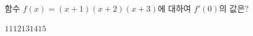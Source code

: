 함수 $f(x)=(x+1)(x+2)(x+3)$에 대하여 $f'(0)$의 값은?
\begin{choices32}{$11$}{$12$}{$13$}{$14$}{$15$}\end{choices32}
